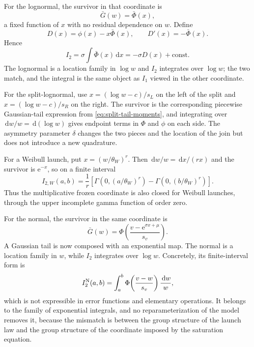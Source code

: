 \documentclass[12pt]{article}
\newcommand{\dd}{\,\mathrm{d}}
\newcommand{\PhiN}{\Phi}
\newcommand{\phiN}{\phi}
\newcommand{\Phibar}{\bar{\Phi}}
\newcommand{\Gbar}{\bar{G}}
\newcommand{\e}{\mathrm{e}}
\theoremstyle{remark}
\begin{document}
For the lognormal, the survivor in that coordinate is
\begin{equation}
  \Gbar(w) = \Phibar(x),
\end{equation}
a fixed function of $x$ with no residual dependence on $w$. Define
\begin{equation}
 D(x)=\phiN(x)-x\Phibar(x),\qquad D'(x)=-\Phibar(x).
 \label{eq:Dfun}
\end{equation}
Hence
\begin{equation}
 I_2=\sigma\int\Phibar(x)\dd x=-\sigma D(x)+\text{const}.
\end{equation}
The lognormal is a location family in $\log w$ and $I_2$ integrates over $\log w$; the two match, and the integral is the same object as $I_1$ viewed in the other coordinate.

For the split-lognormal, use $x=(\log w-c)/s_L$ on the left of the split and $x=(\log w-c)/s_R$ on the right. The survivor is the corresponding piecewise Gaussian-tail expression from \eqref{eq:split-tail-moments}, and integrating over $\dd w/w=\dd(\log w)$ gives endpoint terms in $\PhiN$ and $\phiN$ on each side. The asymmetry parameter $\delta$ changes the two pieces and the location of the join but does not introduce a new quadrature.

For a Weibull launch, put $x=(w/\theta_W)^r$. Then $\dd w/w=\dd x/(rx)$ and the survivor is $\e^{-x}$, so on a finite interval
\begin{equation}
  I_{2,W}(a,b)
   =\frac{1}{r}\left[\Gamma\!\left(0,(a/\theta_W)^r\right)
                    -\Gamma\!\left(0,(b/\theta_W)^r\right)\right].
  \label{eq:weibull-i2}
\end{equation}
Thus the multiplicative frozen coordinate is also closed for Weibull launches, through the upper incomplete gamma function of order zero.

For the normal, the survivor in the same coordinate is
\begin{equation}
 \Gbar(w)=
 \PhiN\!\left(\frac{v-\e^{\sigma x+\mu}}{s_v}\right).
\end{equation}
A Gaussian tail is now composed with an exponential map. The normal is a location family in $w$, while $I_2$ integrates over $\log w$. Concretely, its finite-interval form is
\begin{equation}
 I_2^{\rm N}(a,b)
 =\int_a^b\PhiN\!\left(\frac{v-w}{s_v}\right)\frac{\dd w}{w},
 \label{eq:bad-integral}
\end{equation}
which is not expressible in error functions and elementary operations. It belongs to the family of exponential integrals, and no reparameterization of the model removes it, because the mismatch is between the group structure of the launch law and the group structure of the coordinate imposed by the saturation equation.
\end{document}
